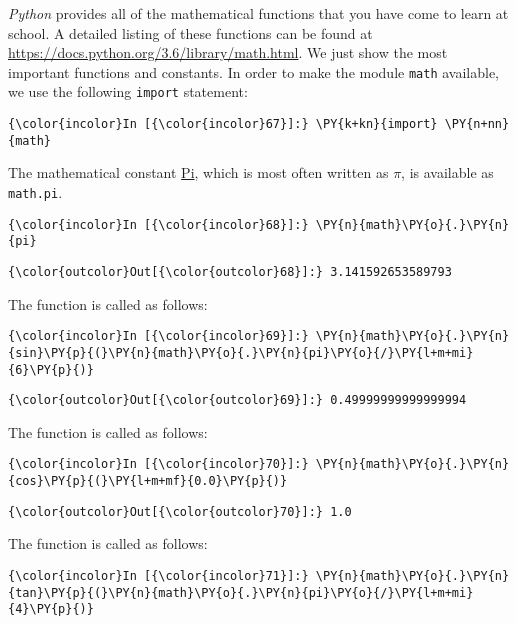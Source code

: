 \textsl{Python} provides all of the mathematical functions that you have
come to learn at school. A detailed listing of these functions can be
found at
\href{https://docs.python.org/3.6/library/math.html}{https://docs.python.org/3.6/library/math.html}. We just
show the most important functions and constants. In order to make the module \texttt{math}
available, we use the following \texttt{import} statement:

\begin{Verbatim}[commandchars=\\\{\}]
{\color{incolor}In [{\color{incolor}67}]:} \PY{k+kn}{import} \PY{n+nn}{math}
\end{Verbatim}
The mathematical constant \href{https://en.wikipedia.org/wiki/Pi}{Pi}, which is most often written as \(\pi\), is
available as \texttt{math.pi}.

\begin{Verbatim}[commandchars=\\\{\}]
{\color{incolor}In [{\color{incolor}68}]:} \PY{n}{math}\PY{o}{.}\PY{n}{pi}
\end{Verbatim}

\begin{Verbatim}[commandchars=\\\{\}]
{\color{outcolor}Out[{\color{outcolor}68}]:} 3.141592653589793
\end{Verbatim}
The  function is called as follows:
\begin{Verbatim}[commandchars=\\\{\}]
{\color{incolor}In [{\color{incolor}69}]:} \PY{n}{math}\PY{o}{.}\PY{n}{sin}\PY{p}{(}\PY{n}{math}\PY{o}{.}\PY{n}{pi}\PY{o}{/}\PY{l+m+mi}{6}\PY{p}{)}
\end{Verbatim}

\begin{Verbatim}[commandchars=\\\{\}]
{\color{outcolor}Out[{\color{outcolor}69}]:} 0.49999999999999994
\end{Verbatim}           
The  function is called as follows: 
\begin{Verbatim}[commandchars=\\\{\}]
{\color{incolor}In [{\color{incolor}70}]:} \PY{n}{math}\PY{o}{.}\PY{n}{cos}\PY{p}{(}\PY{l+m+mf}{0.0}\PY{p}{)}
\end{Verbatim}


\begin{Verbatim}[commandchars=\\\{\}]
{\color{outcolor}Out[{\color{outcolor}70}]:} 1.0
\end{Verbatim}
The  function is called as follows:
\begin{Verbatim}[commandchars=\\\{\}]
{\color{incolor}In [{\color{incolor}71}]:} \PY{n}{math}\PY{o}{.}\PY{n}{tan}\PY{p}{(}\PY{n}{math}\PY{o}{.}\PY{n}{pi}\PY{o}{/}\PY{l+m+mi}{4}\PY{p}{)}
\end{Verbatim}

